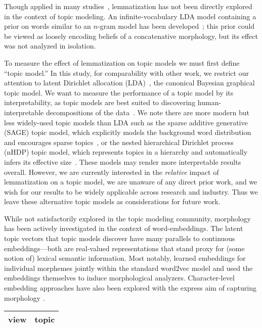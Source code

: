 \documentclass{clv2}
\begin{document}
{Though applied in many
studies~\cite{deerwester1990,hofmann1999,mei2007,nallapati2008,lin2009},
lemmatization has not been directly explored in the context of topic
modeling.  An infinite-vocabulary LDA model containing a prior on words
similar to an $n$-gram model has been developed~\cite{zhai2013}; this
prior could be viewed as loosely encoding beliefs of a
concatenative morphology, but its effect was not analyzed in
isolation.

To measure the effect of lemmatization on topic models we must first
define ``topic model.''  In this study, for comparability with other
work, we restrict our attention to latent Dirichlet allocation
(LDA)~\cite{blei2003}, the canonical Bayesian graphical topic model.
We want to measure the performance of a topic model by its
interpretability, as topic models are best suited to discovering
human-interpretable decompositions of the data~\cite{may2015}.
We note there are more modern but less widely-used topic models than
LDA such as the sparse additive generative
(SAGE) topic model, which explicitly models the background word
distribution and encourages sparse topics~\cite{eisenstein2011}, or the
nested hierarchical Dirichlet process (nHDP) topic model, which
represents topics in a hierarchy and automatically infers its effective
size~\cite{paisley2015}.  These models may render more interpretable
results overall.  However, we are currently interested in the
\emph{relative} impact of lemmatization on a topic model, we are
unaware of any direct prior work, and we wish for our results to be
widely applicable across research and industry.  Thus we leave these
alternative topic models as considerations for future work.

While not satisfactorily explored in the topic modeling community,
morphology has been actively investigated in the context of
word-embeddings.  The latent topic vectors that topic models discover
have many parallels to continuous embeddings---both are real-valued
representations that stand proxy for (some notion of) lexical semantic
information. Most notably,  learned
embeddings for individual morphemes jointly within the standard {\sc word2vec}
model \cite{mikolov2013distributed} and  used the embeddings
themselves to induce morphological analyzers. Character-level embedding approaches
have also been explored with the express aim of capturing morphology \cite{santos2014learning,LingDBTFAML15}.

\begin{table*}
    \centering
    \begin{tabular}{l|l}
        view & topic \\\hline


\end{tabular}
\end{table*}}
\end{document}
